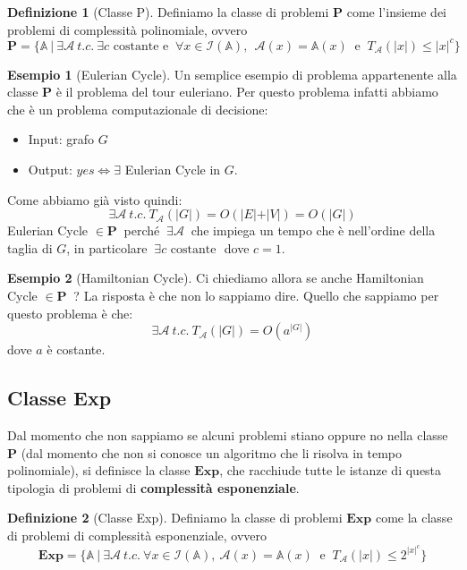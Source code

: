 \documentclass[a4paper]{article}
\theoremstyle{definition}
\newtheorem{esempio}{Esempio}[subsection]
\newtheorem{definit}{Definizione}[subsection]
\newcommand{\Exp}{\mathbf{Exp}}
\newcommand{\p}{\mathbf{P}}
\newcommand{\prob}[1]{\mathbb{#1}}
\newcommand{\instance}[1]{\mathcal{I}(\prob{#1})}
\newcommand{\alg}[1]{\mathcal{#1}}
\newcommand{\compl}[2]{T_\alg{#1}( \vert #2 \vert)}
\begin{document}
			\begin{definit}[Classe P]
				Definiamo la classe di problemi $\p$ come l'insieme dei problemi di complessità polinomiale, ovvero 
				\[ 
					\p = \big\lbrace \prob{A}\ \vert\ \exists \alg{A}\ t.c.\ \exists c \text{ costante e }\ \forall x \in \instance{A},\ \ \alg{A}(x) = \prob{A}(x)\ \text{ e }\ \compl{A}{x} \leq \vert x \vert ^ c \big\rbrace 
				\]
			\end{definit}
			
			\begin{esempio}[Eulerian Cycle]
				Un semplice esempio di problema appartenente alla classe $\p$ è il problema del tour euleriano. Per questo problema infatti abbiamo che è un problema computazionale di decisione:
				\begin{itemize}
					\item Input: grafo $ G $
					\item Output: $ yes \Leftrightarrow \exists $ Eulerian Cycle in $ G $.
				\end{itemize}
				Come abbiamo già visto quindi:
				\[
					\exists \alg{A}\ t.c.\ \compl{A}{G} = O(\vert E\vert + \vert V\vert) = O(\vert G\vert) 
				\] 
				Eulerian Cycle $ \in \p\ $ perché $\ \exists \alg{A}\ $ che impiega un tempo che è nell'ordine della taglia di $ G $, in particolare $ \ \exists c \text{ costante } $ dove $ c=1 $.
			\end{esempio}
			
			
			\begin{esempio}[Hamiltonian Cycle]
				Ci chiediamo allora se anche Hamiltonian Cycle $ \in \p\ $ ? La risposta è che non lo sappiamo dire. Quello che sappiamo per questo problema è che:
				\[
					\exists \alg{A}\ t.c.\ \compl{A}{G} = O(a^{\vert G \vert})
				\]
				dove $ a $ è costante.
			\end{esempio}
			
			\subsection{Classe Exp}
			Dal momento che non sappiamo se alcuni problemi stiano oppure no nella classe $\p$ (dal momento che non si conosce un algoritmo che li risolva in tempo polinomiale), si definisce la classe $\Exp$, che racchiude tutte le istanze di questa tipologia di problemi di \textbf{complessità esponenziale}.
			
			\begin{definit}[Classe Exp]
				Definiamo la classe di problemi $\Exp$ come la classe di problemi di complessità esponenziale, ovvero 
				\[ 
					\Exp = \big\lbrace \prob{A}\ \vert\ \exists \alg{A}\ t.c.\ \forall x \in \instance{A},\ \alg{A}(x) = \prob{A}(x)\ \text{ e }\ \compl{A}{x} \leq 2^{\vert x \vert ^ c} \big\rbrace 
				\]
			\end{definit}
			
\end{document}
